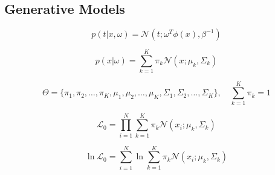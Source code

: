 \documentclass[10pt]{article}
\begin{document}
\begin{multicols}{2}
\section*{Generative Models}

\begin{equation}
    \label{eq:generative}
    p(t | x, \omega) = \mathcal{N}(t ; \omega^{T}\phi(x), \beta^{-1})
\end{equation}

\begin{equation*}
    p(x | \omega) = \sum_{k=1}^{K} \pi_{k} \mathcal{N}(x ; \mu_{k}, \Sigma_{k})
\end{equation*}

\begin{equation*}
    \Theta = \{ \pi_{1}, \pi_{2}, \ldots, \pi_{K}, \mu_{1}, \mu_{2}, \ldots, \mu_{K}, \Sigma_{1}, \Sigma_{2}, \ldots, \Sigma_{K} \}, \quad \sum_{k=1}^{K} \pi_{k} = 1
\end{equation*}


\begin{equation*} \label{eq:observed-likelihood}
    \mathcal{L}_0 = \prod_{i=1}^{N} \sum_{k=1}^{K} \pi_{k} \mathcal{N}(x_i ; \mu_{k}, \Sigma_{k})
\end{equation*}

\begin{equation*} \label{eq:log-likelihood}
    \ln \mathcal{L}_0 = \sum_{i=1}^{N} \ln \sum_{k=1}^{K} \pi_{k} \mathcal{N}(x_i ; \mu_{k}, \Sigma_{k})
\end{equation*}

\end{multicols}
\end{document}
